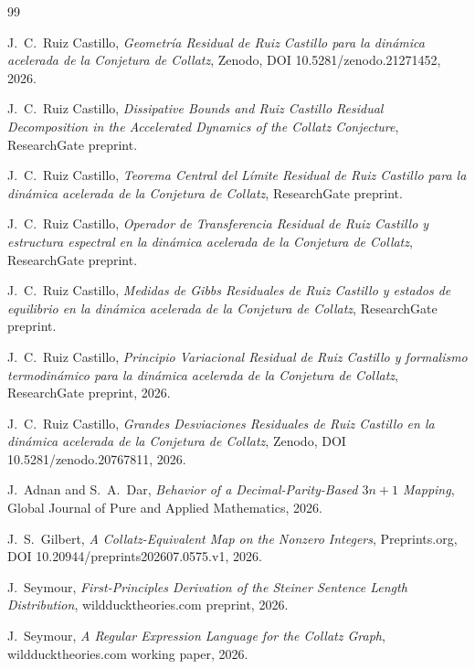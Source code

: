 \documentclass[11pt]{article}
\begin{document}
\begin{thebibliography}{99}

 J.\ C.\ Ruiz Castillo, \emph{Geometría
  Residual de Ruiz Castillo para la dinámica acelerada de la Conjetura
  de Collatz}, Zenodo, DOI 10.5281/zenodo.21271452, 2026.

 J.\ C.\ Ruiz Castillo, \emph{Dissipative
  Bounds and Ruiz Castillo Residual Decomposition in the Accelerated
  Dynamics of the Collatz Conjecture}, ResearchGate preprint.

 J.\ C.\ Ruiz Castillo, \emph{Teorema Central
  del Límite Residual de Ruiz Castillo para la dinámica acelerada de la
  Conjetura de Collatz}, ResearchGate preprint.

 J.\ C.\ Ruiz Castillo, \emph{Operador de
  Transferencia Residual de Ruiz Castillo y estructura espectral en la
  dinámica acelerada de la Conjetura de Collatz}, ResearchGate preprint.

 J.\ C.\ Ruiz Castillo, \emph{Medidas de
  Gibbs Residuales de Ruiz Castillo y estados de equilibrio en la
  dinámica acelerada de la Conjetura de Collatz}, ResearchGate preprint.

 J.\ C.\ Ruiz Castillo, \emph{Principio
  Variacional Residual de Ruiz Castillo y formalismo termodinámico para
  la dinámica acelerada de la Conjetura de Collatz}, ResearchGate
  preprint, 2026.

 J.\ C.\ Ruiz Castillo, \emph{Grandes
  Desviaciones Residuales de Ruiz Castillo en la dinámica acelerada de
  la Conjetura de Collatz}, Zenodo, DOI 10.5281/zenodo.20767811, 2026.

 J.\ Adnan and S.\ A.\ Dar, \emph{Behavior of a
  Decimal-Parity-Based $3n+1$ Mapping}, Global Journal of Pure and
  Applied Mathematics, 2026.

 J.\ S.\ Gilbert, \emph{A Collatz-Equivalent Map on
  the Nonzero Integers}, Preprints.org, DOI
  10.20944/preprints202607.0575.v1, 2026.

 J.\ Seymour, \emph{First-Principles Derivation of
  the Steiner Sentence Length Distribution}, wildducktheories.com
  preprint, 2026.

 J.\ Seymour, \emph{A Regular Expression Language
  for the Collatz Graph}, wildducktheories.com working paper, 2026.


\end{thebibliography}
\end{document}
